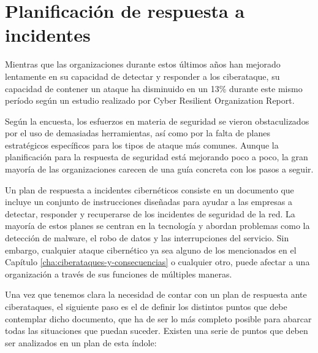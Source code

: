 \chapter{Planificación de respuesta a incidentes}
\label{cha:planificacion-de-respuesta}

Mientras que las organizaciones durante estos últimos años han mejorado lentamente en su capacidad 
de detectar y responder a los ciberataque, su capacidad de contener un ataque ha disminuido en un 
13\% durante este mismo período según un estudio realizado por Cyber Resilient Organization Report.\cite{ibm-article}

Según la encuesta, los esfuerzos en materia de seguridad se vieron obstaculizados por el uso de 
demasiadas herramientas, así como por la falta de planes estratégicos específicos para los tipos de 
ataque más comunes. Aunque la planificación para la respuesta de seguridad está mejorando poco a 
poco, la gran mayoría de las organizaciones carecen de una guía concreta con los pasos a seguir.

Un plan de respuesta a incidentes cibernéticos consiste en un documento que incluye un conjunto 
de instrucciones diseñadas para ayudar a las empresas a detectar, responder y recuperarse de los 
incidentes de seguridad de la red. La mayoría de estos planes se centran en la tecnología y abordan 
problemas como la detección de malware, el robo de datos y las interrupciones del servicio. Sin 
embargo, cualquier ataque cibernético ya sea alguno de los mencionados en el Capítulo 
\ref{cha:ciberataques-y-consecuencias} o cualquier otro, puede afectar a una organización a través 
de sus funciones de múltiples maneras.

Una vez que tenemos clara la necesidad de contar con un plan de respuesta ante ciberataques, el 
siguiente paso es el de definir los distintos puntos que debe contemplar dicho documento, que ha de 
ser lo más completo posible para abarcar todas las situaciones que puedan suceder. Existen una serie 
de puntos que deben ser analizados en un plan de esta índole:

